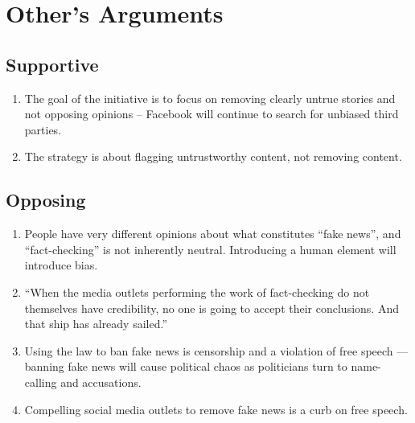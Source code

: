 
\section{Other's Arguments}

\subsection{Supportive}

\begin{enumerate}

\item{The goal of the initiative is to focus on removing clearly untrue stories and not opposing opinions -- Facebook will continue to search for unbiased third parties. \cite{inc_fb_transparency}}

\item{The strategy is about flagging untrustworthy content, not removing content. \cite{inc_fb_transparency}}

\end{enumerate}

\subsection{Opposing}

\begin{enumerate}

\item{People have very different opinions about what constitutes ``fake news'', and ``fact-checking'' is not inherently neutral. Introducing a human element will introduce bias. \cite{vox_sentences_fn} \cite{inc_fb_transparency}}

\item{``When the media outlets performing the work of fact-checking do not themselves have credibility, no one is going to accept their conclusions. And that ship has already sailed.'' \cite{vox_sentences_fn}}

\item{Using the law to ban fake news is censorship and a violation of free speech --- banning fake news will cause political chaos as politicians turn to name-calling and accusations. \cite{eff_cali_bill_distrastrous}}

\item{Compelling social media outlets to remove fake news is a curb on free speech. \cite{wp_germany_fake_news_law}}


\end{enumerate}